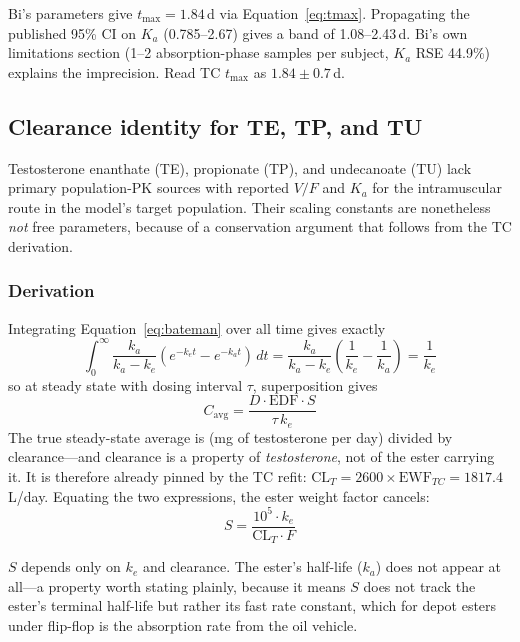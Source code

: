 \documentclass[11pt,a4paper]{article}
\begin{document}
Bi's parameters give $t_{\max} = 1.84$\,d via Equation~\ref{eq:tmax}.
Propagating the published 95\% CI on $K_a$ (0.785--2.67) gives a band of
1.08--2.43\,d. Bi's own limitations section (1--2 absorption-phase
samples per subject, $K_a$ RSE 44.9\%) explains the imprecision. Read TC
$t_{\max}$ as $1.84 \pm 0.7$\,d.

\subsection{Clearance identity for TE, TP, and TU}
\label{sec:identity}

Testosterone enanthate (TE), propionate (TP), and undecanoate (TU) lack
primary population-PK sources with reported $V/F$ and $K_a$ for the
intramuscular route in the model's target population. Their scaling
constants are nonetheless \emph{not} free parameters, because of a
conservation argument that follows from the TC derivation.

\subsubsection{Derivation}

Integrating Equation~\ref{eq:bateman} over all time gives exactly
\[
\int_0^{\infty} \frac{k_a}{k_a-k_e}\left(e^{-k_e t}-e^{-k_a t}\right)\,dt
= \frac{k_a}{k_a-k_e}\left(\frac{1}{k_e}-\frac{1}{k_a}\right) = \frac{1}{k_e}
\]
so at steady state with dosing interval $\tau$, superposition gives
\begin{equation}
C_{\mathrm{avg}} = \frac{D \cdot \mathrm{EDF} \cdot S}{\tau \, k_e}
\label{eq:cavg}
\end{equation}
The true steady-state average is (mg of testosterone per day) divided by
clearance---and clearance is a property of \emph{testosterone}, not of
the ester carrying it. It is therefore already pinned by the TC refit:
$\mathrm{CL}_T = 2600 \times \mathrm{EWF}_{TC} = 1817.4$\,L/day.
Equating the two expressions, the ester weight factor cancels:
\begin{equation}
\boxed{\;S = \frac{10^5 \cdot k_e}{\mathrm{CL}_T \cdot F}\;}
\label{eq:identity}
\end{equation}

$S$ depends only on $k_e$ and clearance. The ester's half-life ($k_a$)
does not appear at all---a property worth stating plainly, because it
means $S$ does not track the ester's terminal half-life but rather its
fast rate constant, which for depot esters under flip-flop is the
absorption rate from the oil vehicle.
\end{document}
